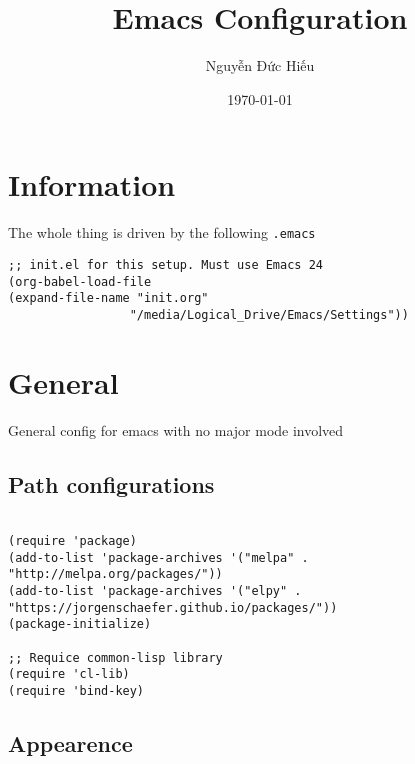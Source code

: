 \documentclass[11pt]{article}
\author{Nguyễn Đức Hiếu}
\date{\today}
\title{Emacs Configuration}
\begin{document}
\maketitle

\section{Information}
\label{sec:org3ef80d1}

The whole thing is driven by the following \texttt{.emacs}

\begin{verbatim}
;; init.el for this setup. Must use Emacs 24
(org-babel-load-file
(expand-file-name "init.org"
                 "/media/Logical_Drive/Emacs/Settings"))

\end{verbatim}

\section{General}
\label{sec:org9fb20ef}
General config for emacs with no major mode involved
\subsection{Path configurations}
\label{sec:org02182ad}

\begin{verbatim}

(require 'package)
(add-to-list 'package-archives '("melpa" . "http://melpa.org/packages/"))
(add-to-list 'package-archives '("elpy" . "https://jorgenschaefer.github.io/packages/"))
(package-initialize)

;; Requice common-lisp library
(require 'cl-lib)
(require 'bind-key)
\end{verbatim}

\subsection{Appearence}
\label{sec:orgc3ea522}
\end{document}
